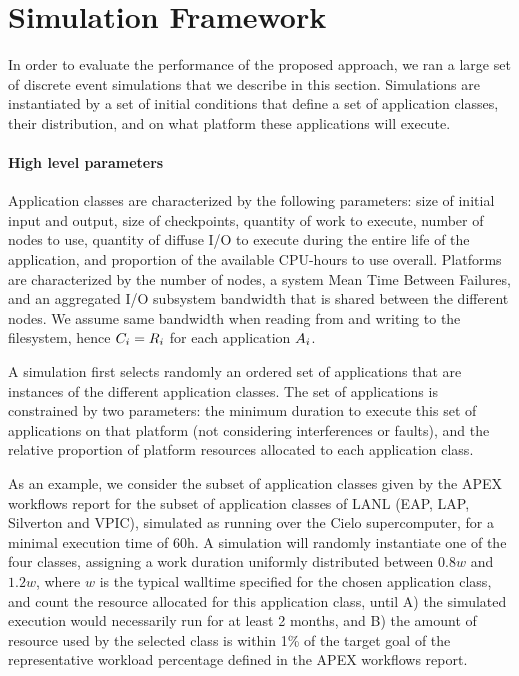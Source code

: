 
\section{Simulation Framework}
\label{sec:simulator}

In order to evaluate the performance of the proposed approach, we
ran a large set of discrete event simulations that we describe in this
section. Simulations are instantiated by a set of initial conditions
that define a set of application classes, their distribution, and
on what platform these applications will execute.

\paragraph*{High level parameters}
Application classes are characterized by the following parameters:
size of initial input and output, size of checkpoints, quantity of
work to execute, number of nodes to use, quantity of diffuse I/O to
execute during the entire life of the application, and proportion of
the available CPU-hours to use overall.  Platforms are characterized
by the number of nodes, a system Mean Time Between Failures, and an
aggregated I/O subsystem bandwidth that is shared between the
different nodes. We assume same bandwidth when reading from and writing to the filesystem,
hence $C_{i}=R_{i}$ for each application $A_{i}$.

A simulation first selects randomly an ordered set of applications
that are instances of the different application classes. The set of
applications is constrained by two parameters: the minimum duration to
execute this set of applications on that platform (not considering
interferences or faults), and the relative proportion of platform
resources allocated to each application class.

As an example, we consider the subset of application classes given by
the APEX workflows report for the subset of application classes of
LANL (EAP, LAP, Silverton and VPIC), simulated as running over the
Cielo supercomputer, for a minimal execution time of 60h. A simulation
will randomly instantiate one of the four classes, assigning a work
duration uniformly distributed between $0.8w$ and $1.2w$, where $w$ is
the typical walltime specified for the chosen application class, and
count the resource allocated for this application class, until A) the
simulated execution would necessarily run for at least 2 months, and B) the
amount of resource used by the selected class is within 1\% of the
target goal of the representative workload percentage defined in the
APEX workflows report.

